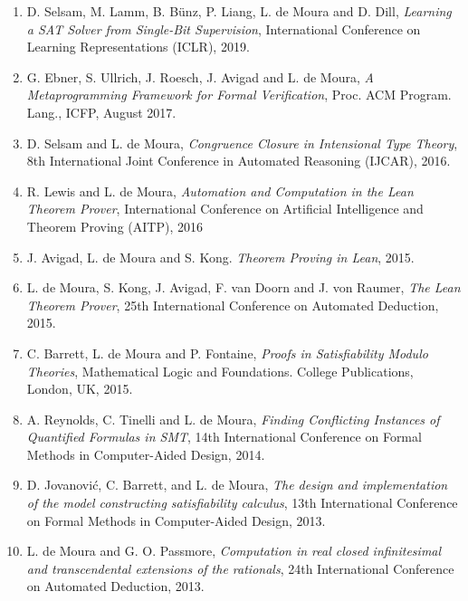 \documentclass{article}
\begin{document}
\begin{enumerate}
\item D. Selsam, M. Lamm, B. Bünz, P. Liang, L. de Moura and D. Dill,
      {\em Learning a SAT Solver from Single-Bit Supervision},
      International Conference on Learning Representations (ICLR), 2019.


\item G. Ebner, S. Ullrich, J. Roesch, J. Avigad and L. de Moura,
      {\em A Metaprogramming Framework for Formal Verification},
      Proc. ACM Program. Lang., ICFP, August 2017.

\item D. Selsam and L. de Moura,
      {\em Congruence Closure in Intensional Type Theory},
8th International Joint Conference in Automated Reasoning (IJCAR), 2016.

\item R. Lewis and L. de Moura,
      {\em Automation and Computation in the Lean Theorem Prover},
      International Conference on Artificial Intelligence and Theorem Proving (AITP), 2016

\item J. Avigad, L. de Moura and S. Kong.
      {\em Theorem Proving in Lean}, 2015.

\item L. de Moura, S. Kong, J. Avigad, F. van Doorn and J. von Raumer,
      {\em  The Lean Theorem Prover},
      25th International Conference on Automated Deduction, 2015.

\item C. Barrett, L. de Moura and P. Fontaine,
  {\em Proofs in Satisfiability Modulo Theories},
  Mathematical Logic and Foundations. College Publications, London, UK, 2015.

\item A. Reynolds, C. Tinelli and L. de Moura,
  {\em Finding Conflicting Instances of Quantified Formulas in SMT},
  14th International Conference on Formal Methods in Computer-Aided Design, 2014.

\item D. Jovanovi\'{c}, C. Barrett, and L. de Moura,
  {\em The design and implementation of the model constructing satisfiability calculus},
13th International Conference on Formal Methods in Computer-Aided Design, 2013.

\item L. de Moura and G. O. Passmore,
  {\em Computation in real closed infinitesimal and transcendental extensions of the rationals},
24th International Conference on Automated Deduction, 2013.


\end{enumerate}
\end{document}
